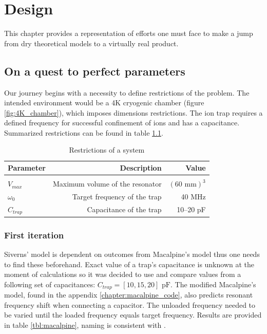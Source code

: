 \chapter{Design}
This chapter provides a representation of efforts one must face to make a jump from dry theoretical models to a virtually real product.

\section{On a quest to perfect parameters}
Our journey begins with a necessity to define restrictions of the problem. The intended environment would be a 4K cryogenic chamber (figure \ref{fig:4K_chamber}), which imposes dimensions restrictions. The ion trap requires a defined frequency for successful confinement of ions and has a capacitance. Summarized restrictions can be found in table \ref{tbl:restrictions}.

\begin{table}[h]
\centering
\begin{tabular}{| l | r | r |}
	\hline
	Parameter & Description & Value \\
	\hline \hline
	&&\\[-1em]
	$V_{max}$ & Maximum volume of the resonator & $\left( 60\text{ mm} \right)^3$ \\[5pt]
	\hline
	$\omega_0$ & Target frequency of the trap & 40 MHz \\
	\hline
	$C_{trap}$ & Capacitance of the trap & 10--20 pF \\
	\hline
\end{tabular}	
\caption{Restrictions of a system}
\label{tbl:restrictions}
\end{table}

\subsection{First iteration}
Siverns' model \cite{Siverns2012} is dependent on outcomes from Macalpine's model \cite{Macalpine2000} thus one needs to find these beforehand. Exact value of a trap's capacitance is unknown at the moment of calculations so it was decided to use and compare values from a following set of capacitances: $C_{trap} = [10, 15, 20]\text{ pF}$. The modified Macalpine's model, found in the appendix \ref{chapter:macalpine_code}, also predicts resonant frequency shift when connecting a capacitor. The unloaded frequency needed to be varied until the loaded frequency equals target frequency. Results are provided in table \ref{tbl:macalpine}, naming is consistent with \cite{Macalpine2000}.

